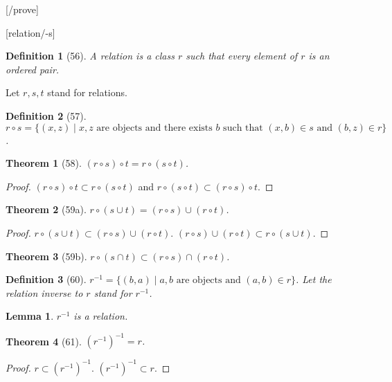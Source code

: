 \documentclass{scrartcl}
\newenvironment{forthel}{\begin{leftbar}}{\end{leftbar}}
\newtheorem*{lemma}{Lemma}
\newtheorem*{theorem}{Theorem}
\newtheorem*{definition}{Definition}
\newcommand{\op}[2]{({#1},{#2})}
\begin{document}
\begin{forthel}

[/prove]

[relation/-s]
\begin{definition}[56] A \emph{relation} is a class $r$ such that
every element of $r$ is an ordered pair.
\end{definition}

Let $r,s,t$ stand for relations.

\begin{definition}[57] 
$r \circ s =
\{\op{x}{z} \mid x,z \text{ are objects and there exists } b \text{ such that }
\op{x}{b} \in s \text{ and } \op{b}{z} \in r\}$.
\end{definition}

\begin{theorem}[58] $(r \circ s) \circ t = r \circ (s \circ t)$.
\end{theorem}
\begin{proof} $(r \circ s) \circ t \subset r \circ (s \circ t)$ and
$r \circ (s \circ t) \subset (r \circ s) \circ t$.
\end{proof}


\begin{theorem}[59a] $r \circ (s \cup t) = (r \circ s) \cup (r \circ t)$.
\end{theorem}
\begin{proof} $r \circ (s \cup t) \subset (r \circ s) \cup (r \circ t)$.
$(r \circ s) \cup (r \circ t) \subset r \circ (s \cup t)$.
\end{proof}

\begin{theorem}[59b] $r \circ (s \cap t) \subset (r \circ s) \cap (r \circ t)$.
\end{theorem}

\begin{definition}[60] $r^{-1} = \{\op{b}{a} \mid a,b \text{ are objects and }
\op{a}{b} \in r\}$.
Let the \emph{relation inverse} to $r$ stand for $r^{-1}$.
\end{definition}

\begin{lemma} $r^{-1}$ is a relation.\end{lemma}

\begin{theorem}[61] $(r^{-1})^{-1} = r$.
\end{theorem}
\begin{proof}
$r \subset (r^{-1})^{-1}$.
$(r^{-1})^{-1} \subset r$.
\end{proof}


\end{forthel}
\end{document}
